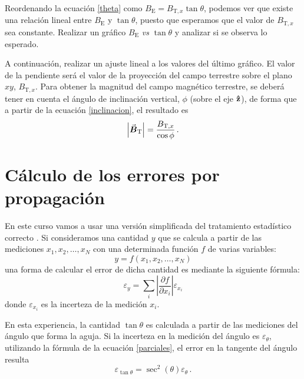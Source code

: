 \documentclass[a4paper,12pt]{article}
\begin{document}
Reordenando la ecuación \ref{theta} como $B_\text{E} = B_{\text{T},x}\tan \theta$, podemos ver que existe una relación lineal entre $B_\text{E}$ y $\tan \theta$, puesto que esperamos que el valor de $B_{\text{T},x}$ sea constante. Realizar un gráfico $B_\text{E}$ \textit{vs} $\tan \theta$ y analizar si se observa lo esperado.\par\medskip

A continuación, realizar un ajuste lineal a los valores del último gráfico. El valor de la pendiente será el valor de la proyección del campo terrestre sobre el plano $xy$, $B_{\text{T},x}$. Para obtener la magnitud del campo magnético terrestre, se deberá tener en cuenta el ángulo de inclinación vertical, $\phi$ (sobre el eje $\vu{z}$), de forma que a partir de la ecuación \ref{inclinacion}, el resultado es 
\begin{equation}\label{modulo}
    \left | \va*{B}_\text{T} \right | = \frac{B_{\text{T},x}}{\cos \phi}\, .
\end{equation}

\printbibliography 

\appendix

\section{Cálculo de los errores por propagación}

En este curso vamos a usar una versión simplificada del tratamiento estadístico correcto \cite{baird1991experimentacion}. Si consideramos una cantidad $y$ que se calcula a partir de las mediciones $x_1, x_2, \dots, x_N$ con una determinada función $f$ de varias variables:
\begin{equation}\label{eq:yfx}
    y = f(x_1,x_2,\dots,x_N)
\end{equation}
una forma de calcular el error de dicha cantidad es mediante la siguiente fórmula:
\begin{equation}\label{parciales}
    \varepsilon_y = \sum_i \left | \frac{\partial f}{\partial x_i} \right | \varepsilon_{x_i}
\end{equation}
donde $\varepsilon_{x_i}$ es la incerteza de la medición $x_i$.\par\medskip

En esta experiencia, la cantidad $\tan \theta$ es calculada a partir de las mediciones del ángulo que forma la aguja. Si la incerteza en la medición del ángulo es $\varepsilon_{\theta}$, utilizando la fórmula de la ecuación \ref{parciales}, el error en la tangente del ángulo resulta
\begin{equation}
    \varepsilon_{\tan \theta} = \sec^2(\theta) \varepsilon_{\theta}\, . 
\end{equation}
\end{document}
